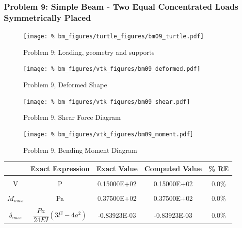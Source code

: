 \subsubsection{Problem 9: Simple Beam - Two Equal Concentrated Loads Symmetrically Placed}
\begin{figure}[h]
    \texttt{[image: \%
                            bm\_figures/turtle\_figures/bm09\_turtle.pdf]}
    \centering
    \caption{Problem 9: Loading, geometry and supports}
    \label{fig:bm09_turtle}
\end{figure}


\begin{figure}[!htb]
    \texttt{[image: \%
                     bm\_figures/vtk\_figures/bm09\_deformed.pdf]}
    \centering
    \caption{Problem 9, Deformed Shape}
    \label{fig:bm09_deformed}
\end{figure}
\begin{figure}[!htb]
    \texttt{[image: \%
                     bm\_figures/vtk\_figures/bm09\_shear.pdf]}
    \centering
    \caption{Problem 9, Shear Force Diagram}
    \label{fig:bm09_shear}
\end{figure}
\begin{figure}[!htb]
    \texttt{[image: \%
                     bm\_figures/vtk\_figures/bm09\_moment.pdf]}
    \centering
    \caption{Problem 9, Bending Moment Diagram}
    \label{fig:bm09_moment}
\end{figure}
\begin{table}[h!]
\centering
\begin{tabular}{ c| c c c c }
    & Exact Expression & Exact Value & Computed Value & \% RE \\ \hline \\
    V   & P & 0.15000E+02 & 0.15000E+02 & 0.0\% \\ \\
    $M_{max}$ & Pa & 0.37500E+02 & 0.37500E+02 & 0.0\% \\ \\
    $\delta_{max}$ & $\dfrac{Pa}{24EI}(3l^2 - 4a^2)$ & -0.83923E-03 & -0.83923E-03 & 0.0\% \\
\end{tabular}
\end{table}

%
%

\clearpage

